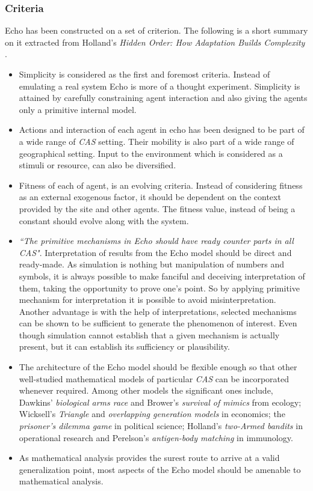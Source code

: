 \subsubsection{Criteria}
Echo has been constructed on a set of criterion. The following is a short summary on it extracted from Holland's \textsl{Hidden Order: How Adaptation Builds Complexity} \cite{holland1996}.

\begin{itemize}
	\item Simplicity is considered as the first and foremost criteria. Instead of emulating a real system Echo is more of a thought experiment. Simplicity is attained by carefully constraining agent interaction and also giving the agents only a primitive internal model. 
	\item Actions and interaction of each agent in echo has been designed to be part of a wide range of \textsl{CAS} setting. Their mobility is also part of a wide range of geographical setting. Input to the environment which is considered as a stimuli or resource, can also be diversified.
	\item Fitness of each of agent, is an evolving criteria. Instead of considering fitness as an external exogenous factor, it should be dependent on the context provided by the site and other agents. The fitness value, instead of being a constant should evolve along with the system. 
	\item \textsl{``The primitive mechanisms in Echo should have ready counter parts in all \textsl{CAS}"}. Interpretation of results from the Echo model should be direct and ready-made. As simulation is nothing but manipulation of numbers and symbols, it is always possible to make fanciful and deceiving interpretation of them, taking the opportunity to prove one's point. So by applying primitive mechanism for interpretation it is possible to avoid misinterpretation. Another advantage is with the help of interpretations, selected mechanisms can be shown to be sufficient to generate the phenomenon of interest. Even though simulation cannot establish that a given mechanism is actually present, but it can establish its sufficiency or plausibility.
	\item The architecture of the Echo model should be flexible enough so that other well-studied mathematical models of particular \textsl{CAS} can be incorporated whenever required. Among other models the significant ones include, Dawkins' \textsl{biological arms race} \cite{dawkins1990} and Brower's \textsl{survival of mimics} \cite{brower1988} from ecology; Wicksell's \textsl{Triangle} \cite{marimon1989} and \textsl{overlapping generation models} \cite{anderson1989} in economics; the \textsl{prisoner's dilemma game} \cite{axelrod1984} in political science; Holland's \textsl{two-Armed bandits} \cite{holland1975} in operational research and Perelson's \textsl{antigen-body matching} \cite{perelson1999} in immunology. 
	\item As mathematical analysis provides the surest route to arrive at a valid generalization point, most aspects of the Echo model should be amenable to mathematical analysis. 
\end{itemize}

